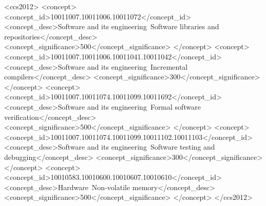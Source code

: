 \documentclass[sigconf,screen]{acmart}
\theoremstyle{invar}
\begin{document}
\title{\papertitle}

\author{Morteza Hoseinzadeh}

\author{Steven Swanson}








\begin{CCSXML}
<ccs2012>
    <concept>
        <concept_id>10011007.10011006.10011072</concept_id>
        <concept_desc>Software and its engineering~Software libraries and repositories</concept_desc>
        <concept_significance>500</concept_significance>
        </concept>
    <concept>
        <concept_id>10011007.10011006.10011041.10011042</concept_id>
        <concept_desc>Software and its engineering~Incremental compilers</concept_desc>
        <concept_significance>300</concept_significance>
        </concept>
    <concept>
        <concept_id>10011007.10011074.10011099.10011692</concept_id>
        <concept_desc>Software and its engineering~Formal software verification</concept_desc>
        <concept_significance>500</concept_significance>
        </concept>
    <concept>
        <concept_id>10011007.10011074.10011099.10011102.10011103</concept_id>
        <concept_desc>Software and its engineering~Software testing and debugging</concept_desc>
        <concept_significance>300</concept_significance>
        </concept>
    <concept>
        <concept_id>10010583.10010600.10010607.10010610</concept_id>
        <concept_desc>Hardware~Non-volatile memory</concept_desc>
        <concept_significance>500</concept_significance>
        </concept>
  </ccs2012>
\end{CCSXML}
\end{document}
